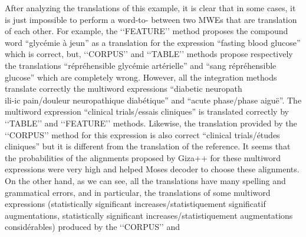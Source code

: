 \documentclass[output=paper,modfonts,nonflat]{langsci/langscibook}
\begin{document}
{{After\ili{} analyzing\ili{} the\ili{} translations\ili{} of\ili{} this\ili{} example\ili{},\ili{} it\ili{} is\ili{} clear\ili{} that\ili{} in\ili{} some\ili{} cases\ili{},\ili{} it\ili{} is\ili{} just\ili{} impossible\ili{} to\ili{} perform\ili{} a\ili{} word\ili{}-to\ili{}-\ili{}\isi{}\ili{} between\ili{} two\ili{} MWEs\ili{} that\ili{} are\ili{} translation\ili{} of\ili{} each\ili{} other\ili{}.\ili{} For\ili{} example\ili{},\ili{} the\ili{} \ili{}`\ili{}`FEATURE\ili{}'\ili{}'\ili{} method\ili{} proposes\ili{} the\ili{} compound\ili{} word\ili{} \ili{}“glycémie\ili{} à\ili{} jeun\ili{}”\ili{} as\ili{} a\ili{} translation\ili{} for\ili{} the\ili{} expression\ili{} \ili{}“fasting\ili{} blood\ili{} glucose\ili{}”\ili{} which\ili{} is\ili{} correct\ili{},\ili{} but\ili{},\ili{} \ili{}`\ili{}`CORPUS\ili{}'\ili{}'\ili{} and\ili{} \ili{}`\ili{}`TABLE\ili{}'\ili{}'\ili{} methods\ili{} propose\ili{} respectively\ili{} the\ili{} translations\ili{} \ili{}“répréhensible\ili{} glycémie\ili{} artérielle\ili{}”\ili{} and\ili{} \ili{}“sang\ili{} répréhensible\ili{} glucose\ili{}”\ili{} which\ili{} are\ili{} completely\ili{} wrong\ili{}.\ili{} However\ili{},\ili{} all\ili{} the\ili{} integration\ili{} methods\ili{} translate\ili{} correctly\ili{} the\ili{} multiword\ili{} expressions\ili{} \ili{}“diabetic\ili{} neuropath\ili{}\\ili{}-ic\ili{} pain\ili{}/douleur\ili{} neuropathique\ili{} diabétique\ili{}”\ili{} and\ili{} \ili{}“acute\ili{} phase\ili{}/phase\ili{} aiguë\ili{}”\ili{}.\ili{} The\ili{} multiword\ili{} expression\ili{} \ili{}“clinical\ili{} trials\ili{}/essais\ili{} cliniques\ili{}”\ili{} is\ili{} translated\ili{} correctly\ili{} by\ili{} \ili{}`\ili{}`TABLE\ili{}'\ili{}'\ili{} and\ili{} \ili{}`\ili{}`FEATURE\ili{}'\ili{}'\ili{} methods\ili{}.\ili{} Likewise\ili{},\ili{} the\ili{} translation\ili{} provided\ili{} by\ili{} the\ili{} \ili{}`\ili{}`CORPUS\ili{}'\ili{}'\ili{} method\ili{} for\ili{} this\ili{} expression\ili{} is\ili{} also\ili{} correct\ili{} \ili{}“clinical\ili{} trials\ili{}/études\ili{} cliniques\ili{}”\ili{} but\ili{} it\ili{} is\ili{} different\ili{} from\ili{} the\ili{} translation\ili{} of\ili{} the\ili{} reference\ili{}.\ili{} It\ili{} seems\ili{} that\ili{} the\ili{} probabilities\ili{} of\ili{} the\ili{} alignments\ili{} proposed\ili{} by\ili{} Giza\ili{}+\ili{}+\ili{} for\ili{} these\ili{} multiword\ili{} expressions\ili{} were\ili{} very\ili{} high\ili{} and\ili{} helped\ili{} Moses\ili{} decoder\ili{} to\ili{} choose\ili{} these\ili{} alignments\ili{}.\ili{} On\ili{} the\ili{} other\ili{} hand\ili{},\ili{} as\ili{} we\ili{} can\ili{} see\ili{},\ili{} all\ili{} the\ili{} translations\ili{} have\ili{} many\ili{} spelling\ili{} and\ili{} grammatical\ili{} errors\ili{},\ili{} and\ili{} in\ili{} particular\ili{},\ili{} the\ili{} translations\ili{} of\ili{} some\ili{} multiword\ili{} expressions\ili{} \ili{}(statistically\ili{} significant\ili{} increases\ili{}/statistiquement\ili{} significatif\ili{} augmentations\ili{},\ili{} statistically\ili{} significant\ili{} increases\ili{}/statistiquement\ili{} augmentations\ili{} considérables\ili{})\ili{} produced\ili{} by\ili{} the\ili{} \ili{}`\ili{}`CORPUS\ili{}'\ili{}'\ili{} and\ili{} }}
\end{document}
